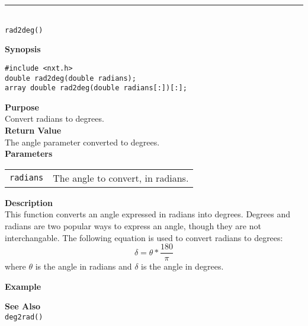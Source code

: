 \noindent
\vspace{5pt}
\rule{4.5in}{0.015in}\\
\noindent
{\LARGE \texttt{rad2deg()}}\\
{}

\noindent
{\bf Synopsis}
\vspace{-8pt}
\begin{verbatim}
#include <nxt.h>
double rad2deg(double radians);
array double rad2deg(double radians[:])[:];
\end{verbatim}

\noindent
{\bf Purpose}\\
Convert radians to degrees.\\

\noindent
{\bf Return Value}\\
The angle parameter converted to degrees.\\

\noindent
{\bf Parameters}
\vspace{-0.1in}
\begin{description}
\item               
\begin{tabular}{p{15 mm}p{145 mm}}
\texttt{radians} & The angle to convert, in radians. \\
\end{tabular}
\end{description}

\noindent
{\bf Description}\\
This function converts an angle expressed in radians into degrees. Degrees and
radians are two popular ways to express an angle, though they are not interchangable.
The following equation is used to convert radians to degrees:
\begin{equation*}
\delta = \theta * \frac{180}{\pi}
\end{equation*}
where $\theta$ is the angle in radians and $\delta$ is the angle in degrees.

\noindent
{\bf Example}\\
\noindent

\noindent
{\bf See Also}\\
\texttt{deg2rad()}

